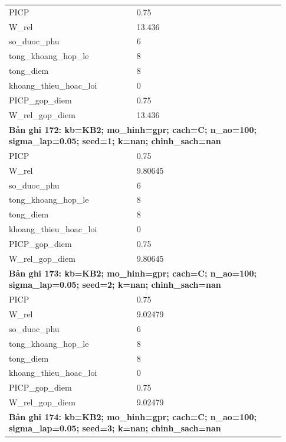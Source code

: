 \begin{longtable}{p{0.43\linewidth}p{0.50\linewidth}}
PICP & 0.75 \\
W\_\allowbreak rel & 13.436 \\
so\_\allowbreak duoc\_\allowbreak phu & 6 \\
tong\_\allowbreak khoang\_\allowbreak hop\_\allowbreak le & 8 \\
tong\_\allowbreak diem & 8 \\
khoang\_\allowbreak thieu\_\allowbreak hoac\_\allowbreak loi & 0 \\
PICP\_\allowbreak gop\_\allowbreak diem & 0.75 \\
W\_\allowbreak rel\_\allowbreak gop\_\allowbreak diem & 13.436 \\
\midrule
\multicolumn{2}{p{0.95\linewidth}}{\textbf{Bản ghi 172: kb=KB2; mo\_hinh=gpr; cach=C; n\_ao=100; sigma\_lap=0.05; seed=1; k=nan; chinh\_sach=nan}} \\
PICP & 0.75 \\
W\_\allowbreak rel & 9.80645 \\
so\_\allowbreak duoc\_\allowbreak phu & 6 \\
tong\_\allowbreak khoang\_\allowbreak hop\_\allowbreak le & 8 \\
tong\_\allowbreak diem & 8 \\
khoang\_\allowbreak thieu\_\allowbreak hoac\_\allowbreak loi & 0 \\
PICP\_\allowbreak gop\_\allowbreak diem & 0.75 \\
W\_\allowbreak rel\_\allowbreak gop\_\allowbreak diem & 9.80645 \\
\midrule
\multicolumn{2}{p{0.95\linewidth}}{\textbf{Bản ghi 173: kb=KB2; mo\_hinh=gpr; cach=C; n\_ao=100; sigma\_lap=0.05; seed=2; k=nan; chinh\_sach=nan}} \\
PICP & 0.75 \\
W\_\allowbreak rel & 9.02479 \\
so\_\allowbreak duoc\_\allowbreak phu & 6 \\
tong\_\allowbreak khoang\_\allowbreak hop\_\allowbreak le & 8 \\
tong\_\allowbreak diem & 8 \\
khoang\_\allowbreak thieu\_\allowbreak hoac\_\allowbreak loi & 0 \\
PICP\_\allowbreak gop\_\allowbreak diem & 0.75 \\
W\_\allowbreak rel\_\allowbreak gop\_\allowbreak diem & 9.02479 \\
\midrule
\multicolumn{2}{p{0.95\linewidth}}{\textbf{Bản ghi 174: kb=KB2; mo\_hinh=gpr; cach=C; n\_ao=100; sigma\_lap=0.05; seed=3; k=nan; chinh\_sach=nan}} \\

\end{longtable}
